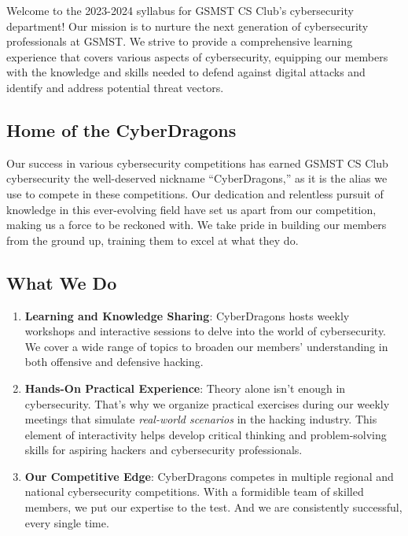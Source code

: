 \documentclass[
  letterpaper,
  DIV=11,
  numbers=noendperiod]{scrartcl}
\providecommand{\tightlist}{%
  \setlength{\itemsep}{0pt}\setlength{\parskip}{0pt}}\usepackage{longtable,booktabs,array}
\begin{document}
Welcome to the 2023-2024 syllabus for GSMST CS Club's cybersecurity
department! Our mission is to nurture the next generation of
cybersecurity professionals at GSMST. We strive to provide a
comprehensive learning experience that covers various aspects of
cybersecurity, equipping our members with the knowledge and skills
needed to defend against digital attacks and identify and address
potential threat vectors.

\hypertarget{home-of-the-cyberdragons}{%
\subsection{Home of the CyberDragons}\label{home-of-the-cyberdragons}}

Our success in various cybersecurity competitions has earned GSMST CS
Club cybersecurity the well-deserved nickname ``CyberDragons,'' as it is
the alias we use to compete in these competitions. Our dedication and
relentless pursuit of knowledge in this ever-evolving field have set us
apart from our competition, making us a force to be reckoned with. We
take pride in building our members from the ground up, training them to
excel at what they do.

\hypertarget{what-we-do}{%
\subsection{What We Do}\label{what-we-do}}

\begin{enumerate}
\def\labelenumi{\arabic{enumi}.}
\tightlist
\item
  \textbf{Learning and Knowledge Sharing}: CyberDragons hosts weekly
  workshops and interactive sessions to delve into the world of
  cybersecurity. We cover a wide range of topics to broaden our members'
  understanding in both offensive and defensive hacking.
\item
  \textbf{Hands-On Practical Experience}: Theory alone isn't enough in
  cybersecurity. That's why we organize practical exercises during our
  weekly meetings that simulate \emph{real-world scenarios} in the
  hacking industry. This element of interactivity helps develop critical
  thinking and problem-solving skills for aspiring hackers and
  cybersecurity professionals.
\item
  \textbf{Our Competitive Edge}: CyberDragons competes in multiple
  regional and national cybersecurity competitions. With a formidible
  team of skilled members, we put our expertise to the test. And we are
  consistently successful, every single time.
\end{enumerate}
\end{document}
